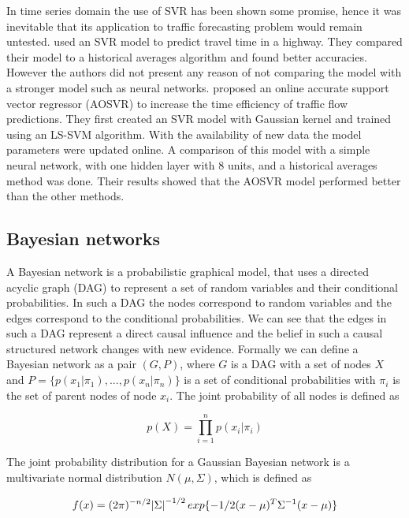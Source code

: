 In time series domain the use of SVR has been shown some promise, hence it was inevitable that its
application to traffic forecasting problem would remain untested. \citet{wu2004travel} used an SVR
model to predict travel time in a highway. They compared their model to a historical averages algorithm
and found better accuracies. However the authors did not present any reason of not comparing the model
with a stronger model such as neural networks.
\citet{zeng2008svr} proposed an online accurate support vector regressor (AOSVR) to increase the time
efficiency of traffic flow predictions. They first created an SVR model with Gaussian kernel and trained using an
LS-SVM algorithm. With the availability of new data the model parameters were updated online. A
comparison of this model with a simple neural network, with one hidden layer with 8 units, and
a historical averages method was done. Their results showed that the AOSVR model performed better
than the other methods.

\subsection{Bayesian networks}
A Bayesian network is a probabilistic graphical model, that uses a directed acyclic graph (DAG) to
represent a set of random variables and their conditional probabilities. In such a DAG the nodes
correspond to random variables and the edges correspond to the conditional probabilities. We can see
that the edges in such a DAG represent a direct causal influence and the belief in such a causal
structured network changes with new evidence. Formally we can define a Bayesian network as a
pair $(G,P)$, where $G$ is a DAG with a set of nodes $X$ and $P = \{p(x_{1}|\pi_{1}),..., p(x_{n}|\pi_{n})\}$
is a set of conditional probabilities with $\pi_{i}$ is the set of parent nodes of node $x_{i}$.
The joint probability of all nodes is defined as

     \begin{equation} p(X) =  \prod_{i = 1}^n p(x_{i}|\pi_{i}) \end{equation}

The joint probability distribution for a Gaussian Bayesian network is a multivariate
normal distribution $N(\mu, \Sigma)$, which is defined as

     \begin{equation}
      f(x) =  (2\pi)^{-n/2} \abs{\Sigma}^{-1/2} exp\{-1/2(x-\mu)^T \Sigma^{-1}(x-\mu)\}
     \end{equation}

